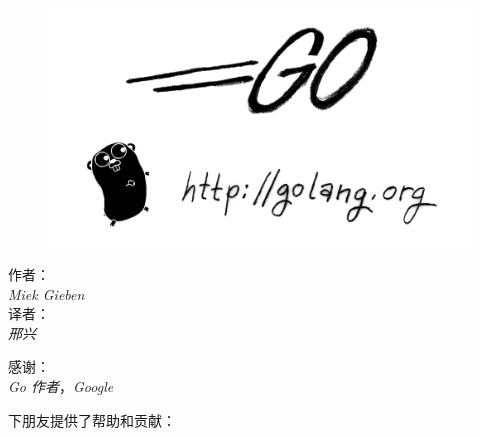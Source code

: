 \documentclass[a4paper,twoside,openleft]{blocksbook}
\begin{document}
\begin{cjk}
\thispagestyle{empty}
\newcommand{\version}{0.5}
\begin{center}
\vspace{0.5cm}
{}
\end{center}
\vspace*{2cm}
\begin{figure}[h!]
\begin{center}
    \includegraphics[scale=0.65]{fig/bumper-inverse.png}
\end{center}
\end{figure}
\vspace*{0.02\stockheight}
\begin{minipage}{0.4\textwidth}
\begin{flushleft} \large
\hspace*{2.0cm}作者：\\
\hspace*{2.0cm}\emph{Miek Gieben}\\
\hspace*{2.0cm}译者：\\
\hspace*{2.0cm}\emph{邢兴}\\
\vfill
\end{flushleft}
\end{minipage}
\hspace{5mm}
\begin{minipage}{0.4\textwidth}
\begin{flushright} \large
感谢：\\
\emph{Go 作者}，\emph{Google}\\
\vfill
\end{flushright}
\end{minipage}
\vspace*{0.5cm}
\begin{center}
下朋友提供了帮助和贡献：


\end{center}
\end{cjk}
\end{document}
